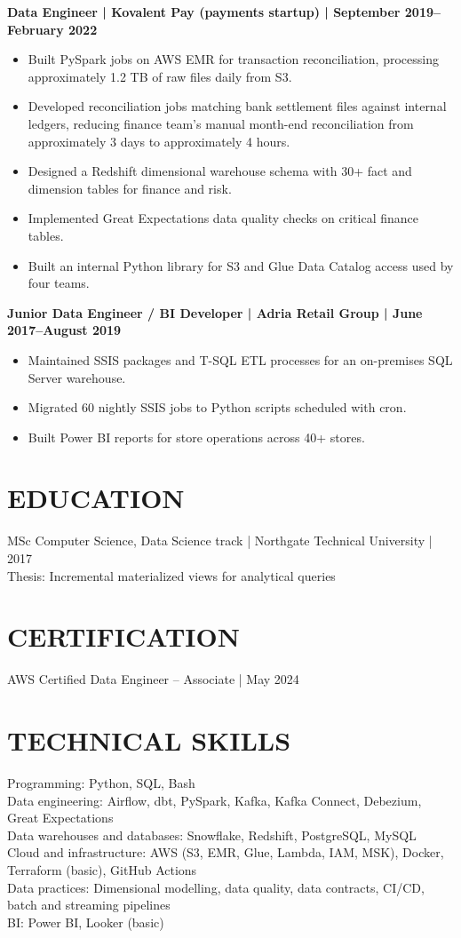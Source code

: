 \documentclass[11pt,a4paper]{article}
\begin{document}
\textbf{Data Engineer | Kovalent Pay (payments startup) | September 2019--February 2022}
\begin{itemize}
\item Built PySpark jobs on AWS EMR for transaction reconciliation, processing approximately 1.2 TB of raw files daily from S3.
\item Developed reconciliation jobs matching bank settlement files against internal ledgers, reducing finance team's manual month-end reconciliation from approximately 3 days to approximately 4 hours.
\item Designed a Redshift dimensional warehouse schema with 30+ fact and dimension tables for finance and risk.
\item Implemented Great Expectations data quality checks on critical finance tables.
\item Built an internal Python library for S3 and Glue Data Catalog access used by four teams.
\end{itemize}

\textbf{Junior Data Engineer / BI Developer | Adria Retail Group | June 2017--August 2019}
\begin{itemize}
\item Maintained SSIS packages and T-SQL ETL processes for an on-premises SQL Server warehouse.
\item Migrated 60 nightly SSIS jobs to Python scripts scheduled with cron.
\item Built Power BI reports for store operations across 40+ stores.
\end{itemize}

\section*{EDUCATION}
MSc Computer Science, Data Science track | Northgate Technical University | 2017\\
Thesis: Incremental materialized views for analytical queries

\section*{CERTIFICATION}
AWS Certified Data Engineer -- Associate | May 2024

\section*{TECHNICAL SKILLS}
Programming: Python, SQL, Bash\\
Data engineering: Airflow, dbt, PySpark, Kafka, Kafka Connect, Debezium, Great Expectations\\
Data warehouses and databases: Snowflake, Redshift, PostgreSQL, MySQL\\
Cloud and infrastructure: AWS (S3, EMR, Glue, Lambda, IAM, MSK), Docker, Terraform (basic), GitHub Actions\\
Data practices: Dimensional modelling, data quality, data contracts, CI/CD, batch and streaming pipelines\\
BI: Power BI, Looker (basic)
\end{document}
